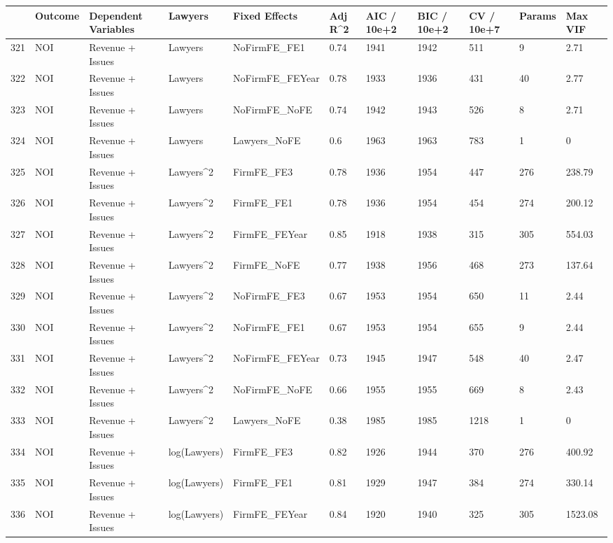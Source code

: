 \documentclass{article}
\begin{document}
\begin{table}[H]
\centering
\begin{tabular}{rllllllllll}
  \hline
 & Outcome & Dependent Variables & Lawyers & Fixed Effects & Adj R^2 & AIC / 10e+2 & BIC / 10e+2 & CV / 10e+7 & Params & Max VIF \\ 
  \hline
321 & NOI & Revenue + Issues & Lawyers & NoFirmFE\_FE1 & 0.74 & 1941 & 1942 & 511 & 9 & 2.71 \\ 
  322 & NOI & Revenue + Issues & Lawyers & NoFirmFE\_FEYear & 0.78 & 1933 & 1936 & 431 & 40 & 2.77 \\ 
  323 & NOI & Revenue + Issues & Lawyers & NoFirmFE\_NoFE & 0.74 & 1942 & 1943 & 526 & 8 & 2.71 \\ 
  324 & NOI & Revenue + Issues & Lawyers & Lawyers\_NoFE & 0.6 & 1963 & 1963 & 783 & 1 & 0 \\ 
  325 & NOI & Revenue + Issues & Lawyers^2 & FirmFE\_FE3 & 0.78 & 1936 & 1954 & 447 & 276 & 238.79 \\ 
  326 & NOI & Revenue + Issues & Lawyers^2 & FirmFE\_FE1 & 0.78 & 1936 & 1954 & 454 & 274 & 200.12 \\ 
  327 & NOI & Revenue + Issues & Lawyers^2 & FirmFE\_FEYear & 0.85 & 1918 & 1938 & 315 & 305 & 554.03 \\ 
  328 & NOI & Revenue + Issues & Lawyers^2 & FirmFE\_NoFE & 0.77 & 1938 & 1956 & 468 & 273 & 137.64 \\ 
  329 & NOI & Revenue + Issues & Lawyers^2 & NoFirmFE\_FE3 & 0.67 & 1953 & 1954 & 650 & 11 & 2.44 \\ 
  330 & NOI & Revenue + Issues & Lawyers^2 & NoFirmFE\_FE1 & 0.67 & 1953 & 1954 & 655 & 9 & 2.44 \\ 
  331 & NOI & Revenue + Issues & Lawyers^2 & NoFirmFE\_FEYear & 0.73 & 1945 & 1947 & 548 & 40 & 2.47 \\ 
  332 & NOI & Revenue + Issues & Lawyers^2 & NoFirmFE\_NoFE & 0.66 & 1955 & 1955 & 669 & 8 & 2.43 \\ 
  333 & NOI & Revenue + Issues & Lawyers^2 & Lawyers\_NoFE & 0.38 & 1985 & 1985 & 1218 & 1 & 0 \\ 
  334 & NOI & Revenue + Issues & log(Lawyers) & FirmFE\_FE3 & 0.82 & 1926 & 1944 & 370 & 276 & 400.92 \\ 
  335 & NOI & Revenue + Issues & log(Lawyers) & FirmFE\_FE1 & 0.81 & 1929 & 1947 & 384 & 274 & 330.14 \\ 
  336 & NOI & Revenue + Issues & log(Lawyers) & FirmFE\_FEYear & 0.84 & 1920 & 1940 & 325 & 305 & 1523.08 \\ 

\end{tabular}
\end{table}
\end{document}
